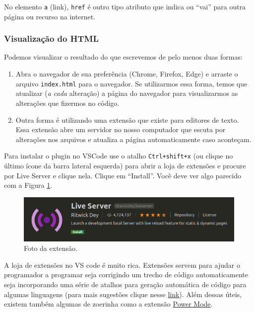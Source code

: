 No elemento \texttt{a} (link), \texttt{href} é outro tipo atributo que
indica ou ``vai'' para outra página ou recurso na internet.


\subsubsection{Visualização do HTML}
Podemos visualizar o resultado do que escrevemos de pelo menos duas
formas:

\begin{enumerate}
\item
  Abra o navegador de sua preferência (Chrome, Firefox, Edge) e arraste
  o arquivo \texttt{index.html} para o navegador. Se utilizarmos essa
  forma, temos que atualizar (\emph{a cada} alteração) a página do
  navegador para visualizarmos as alterações que fizermos no código.
\item
  Outra forma é utilizando uma extensão que existe para editores de
  texto. Essa extensão abre um servidor no nosso computador que escuta
  por alterações nos arquivos e atualiza a página automaticamente caso
  aconteçam.
\end{enumerate}

Para instalar o plugin no VSCode use o atalho \texttt{Ctrl+shift+x} (ou
clique no último ícone da barra lateral esquerda) para abrir a loja de
extensões e procure por Live Server e clique nela. Clique em ``Install''.
Você deve ver algo parecido com a Figura \ref{fig:live-server-ext}.

\begin{figure}[h!]
    \centering
    \includegraphics[scale=.5]{imgs/live-server-extension.png}
    \caption{Foto da extensão.}
    \label{fig:live-server-ext}
\end{figure}

A loja de extensões no VS code é muito rica. Extensões servem para
ajudar o programador a programar seja corrigindo um trecho de código
automaticamente seja incorporando uma série de atalhos para geração
automática de código para algumas linguagens (para mais sugestões clique
nesse
\href{https://www.ubuntupit.com/best-visual-studio-code-extensions-for-programmers/}{link}).
Além dessas úteis, existem também algumas de zoerinha como a extensão
\href{https://marketplace.visualstudio.com/items?itemName=hoovercj.vscode-power-mode}{Power
Mode}.

